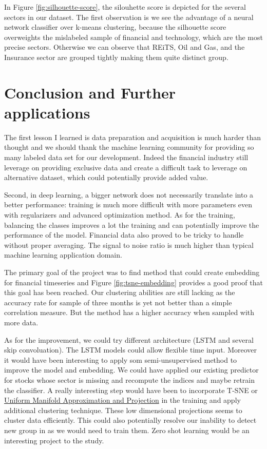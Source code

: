 \documentclass[a4paper,twoside]{article}
\begin{document}
In Figure \ref{fig:silhouette-score}, the silouhette score is depicted for the
several sectors in our dataset. The first observation is we see the advantage
of a neural network classifier over k-means clustering, because the silhouette
score overweights the mislabeled sample of financial and technology, which are
the most precise sectors. Otherwise we can observe that REiTS, Oil and Gas,
and the Insurance sector are grouped tightly making them quite distinct group.


\section{Conclusion and Further applications}
\label{sec:org2ffb474}

The first lesson I learned is data preparation and acquisition is much harder
than thought and we should thank the machine learning community for providing
so many labeled data set for our development. Indeed the financial industry
still leverage on providing exclusive data and create a difficult task to
leverage on alternative dataset, which could potentially provide added value.

Second, in deep learning, a bigger network does not necessarily translate into
a better performance: training is much more difficult with more parameters
even with regularizers and advanced optimization method. As for the training,
balancing the classes improves a lot the training and can potentially improve
the performance of the model. Financial data also proved to be tricky to
handle without proper averaging. The signal to noise ratio is much higher than
typical machine learning application domain.

The primary goal of the project was to find method that could create embedding
for financial timeseries and Figure \ref{fig:tsne-embedding} provides a good
proof that this goal has been reached. Our clustering abilities are still
lacking as the accuracy rate for sample of three months is yet not better than
a simple correlation measure. But the method has a higher accuracy when
sampled with more data. 

As for the improvement, we could try different architecture (LSTM and several
skip convoluation). The LSTM models could allow flexible time input. Moreover
it would have been interesting to apply som semi-unsupervised method to
improve the model and embedding. We could have applied our existing predictor
for stocks whose sector is missing and recompute the indices and maybe retrain
the classifier. A really interesting step would have been to incorporate T-SNE
or \href{https://github.com/lmcinnes/umap}{Uniform Manifold Approximation and Projection} in the training and apply
additional clustering technique. These low dimensional projections seems to
cluster data efficiently. This could also potentially resolve our inability to
detect new group in as we would need to train them. Zero shot learning would
be an interesting project to the study.
\end{document}
